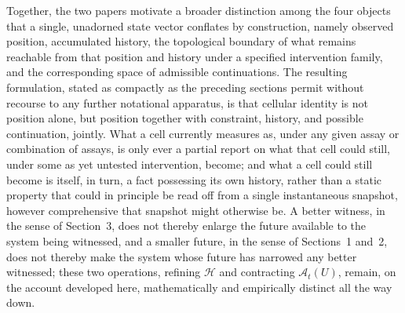 \documentclass[11pt]{article}
\begin{document}
Together, the two papers motivate a broader distinction among the four objects that a single, unadorned state vector conflates by construction, namely observed position, accumulated history, the topological boundary of what remains reachable from that position and history under a specified intervention family, and the corresponding space of admissible continuations. The resulting formulation, stated as compactly as the preceding sections permit without recourse to any further notational apparatus, is that cellular identity is not position alone, but position together with constraint, history, and possible continuation, jointly. What a cell currently measures as, under any given assay or combination of assays, is only ever a partial report on what that cell could still, under some as yet untested intervention, become; and what a cell could still become is itself, in turn, a fact possessing its own history, rather than a static property that could in principle be read off from a single instantaneous snapshot, however comprehensive that snapshot might otherwise be. A better witness, in the sense of Section~3, does not thereby enlarge the future available to the system being witnessed, and a smaller future, in the sense of Sections~1 and~2, does not thereby make the system whose future has narrowed any better witnessed; these two operations, refining $\mathcal{H}$ and contracting $\mathcal{A}_t(U)$, remain, on the account developed here, mathematically and empirically distinct all the way down.

\newpage
\end{document}
